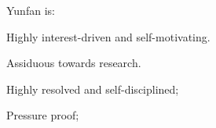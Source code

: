 
\begin{cventries}

  \cventry
    {Yunfan is:} %
    {} %
    {} %
    {} %
    {
      \begin{cvitems} %
        \item {Highly interest-driven and self-motivating.}
        \item {Assiduous towards research.}
        \item {Highly resolved and self-disciplined;}
        \item {Pressure proof;}
      \end{cvitems}
    }

\end{cventries}
